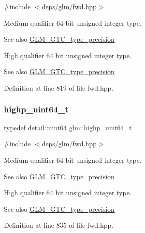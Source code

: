 {\ttfamily \#include $<$\hyperlink{fwd_8hpp}{deps/glm/fwd.\+hpp}$>$}

Medium qualifier 64 bit unsigned integer type. \begin{DoxySeeAlso}{See also}
\hyperlink{group__gtc__type__precision}{G\+L\+M\+\_\+\+G\+T\+C\+\_\+type\+\_\+precision}
\end{DoxySeeAlso}
High qualifier 64 bit unsigned integer type. \begin{DoxySeeAlso}{See also}
\hyperlink{group__gtc__type__precision}{G\+L\+M\+\_\+\+G\+T\+C\+\_\+type\+\_\+precision} 
\end{DoxySeeAlso}


Definition at line 819 of file fwd.\+hpp.

\mbox{\label{group__gtc__type__precision_ga6e66f40c5909bfc872b068187fa6029e}} 
\subsubsection{\texorpdfstring{highp\+\_\+uint64\+\_\+t}{highp\_uint64\_t}}
{\footnotesize\ttfamily typedef detail\+::uint64 \hyperlink{group__gtc__type__precision_ga6e66f40c5909bfc872b068187fa6029e}{glm\+::highp\+\_\+uint64\+\_\+t}}



{\ttfamily \#include $<$\hyperlink{fwd_8hpp}{deps/glm/fwd.\+hpp}$>$}

Medium qualifier 64 bit unsigned integer type. \begin{DoxySeeAlso}{See also}
\hyperlink{group__gtc__type__precision}{G\+L\+M\+\_\+\+G\+T\+C\+\_\+type\+\_\+precision}
\end{DoxySeeAlso}
High qualifier 64 bit unsigned integer type. \begin{DoxySeeAlso}{See also}
\hyperlink{group__gtc__type__precision}{G\+L\+M\+\_\+\+G\+T\+C\+\_\+type\+\_\+precision} 
\end{DoxySeeAlso}


Definition at line 835 of file fwd.\+hpp.

\mbox{\label{group__gtc__type__precision_ga2c27c6dd26e893786f04b10f99c1ee95}} 
